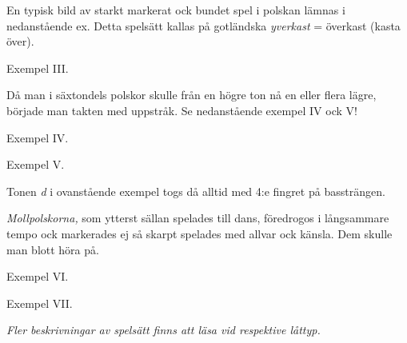 {

\vspace{10mm}

En typisk bild av starkt markerat ock bundet spel i polskan lämnas i nedanstående ex.
Detta spelsätt kallas på gotländska \textit{\guillemotright{}yverkast\guillemotright{}}
= överkast (kasta över).

\vspace{5mm}

Exempel III.


\newpage

Då man i säxtondels polskor skulle från en högre ton nå en eller flera lägre,
började man takten med uppstråk. Se nedanstående exempel IV ock V!

\vspace{5mm}

Exempel IV.


\vspace{5mm}

Exempel V.


Tonen \textit{d} i ovanstående exempel togs då alltid med 4:e fingret på bassträngen.

\vspace{10mm}

\textit{Mollpolskorna,} som ytterst sällan spelades till dans,
föredrogos i långsammare tempo ock markerades ej så skarpt
\textemdash{} spelades med allvar ock känsla. Dem skulle man blott
\guillemotright{}höra på\guillemotright{}.

\vspace{5mm}

Exempel VI.


\vspace{5mm}

Exempel VII.


\vspace{15mm}

\textit{Fler beskrivningar av spelsätt finns att läsa vid respektive låttyp.}


}
\restoregeometry
\fancyhfoffset[E,O]{0pt}
\clearpage
\pagestyle{main}
